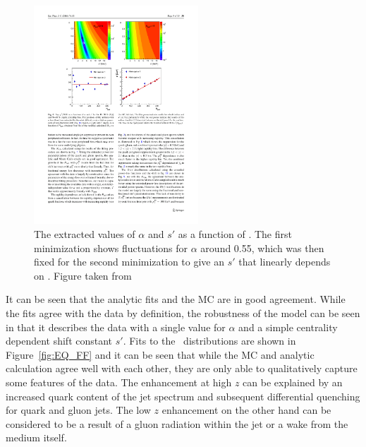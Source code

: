 \begin{figure}[htbp]
\begin{center}
\includegraphics[width=0.55\textwidth]{figures/jetMeasurements/EQ_fitQuality}
\caption{The extracted values of $\alpha$ and $s'$ as a function of \Npart. The first minimization shows fluctuations for $\alpha$ around 0.55, which was then fixed for the second minimization to give an $s'$ that linearly depends on \Npart. Figure taken from \cite{Spousta:2015fca}}
\label{fig:eq_param}
\end{center}
\end{figure}

It can be seen that the analytic fits and the MC are in good agreement. While the fits agree with the data by definition, the robustness of the model can be seen in that it describes the data with a single value for $\alpha$ and a simple centrality dependent shift constant $s'$.  Fits to the \Dz\ distributions are shown in Figure~\ref{fig:EQ_FF} and it can be seen that while the MC and analytic calculation agree well with each other, they are only able to qualitatively capture some features of the data. The enhancement at high $z$ can be explained by an increased quark content of the jet spectrum and subsequent differential quenching for quark and gluon jets. The low $z$ enhancement on the other hand can be considered to be a result of a gluon radiation within the jet or a wake from the medium itself.

